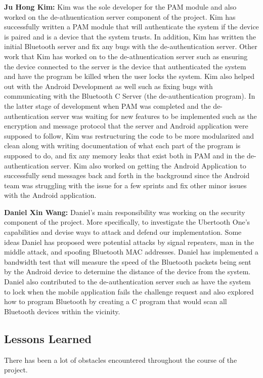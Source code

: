 \documentclass[letterpaper,twocolumn,10pt]{article}
\begin{document}
{{\textbf{Ju Hong Kim:} Kim was the sole developer for the PAM module and also worked on the de-athuentication server component of the project. Kim has successfully written a PAM module that will authenticate the system if the device is paired and is a device that the system trusts. In addition, Kim has written the initial Bluetooth server and fix any bugs with the de-authentication server. Other work that Kim has worked on to the de-athuentication server such as ensuring the device connected to the server is the device that authenticated the system and have the program be killed when the user locks the system. Kim also helped out with the Android Development as well such as fixing bugs with communicating with the Bluetooth C Server (the de-authentication program). In the latter stage of development when PAM  was completed and the de-authentication server was waiting for new features to be implemented such as the encryption and message protocol that the server and Android application were supposed to follow, Kim was restructuring the code to be more modularized and clean along with writing documentation of what each part of the program is supposed to do, and fix any memory leaks that exist both in PAM and in the de-authentication server. Kim also worked on getting the Android Application to successfully send messages back and forth in the background since the Android team was struggling with the issue for a few sprints and fix other minor issues with the Android application.

\textbf{Daniel Xin Wang:} Daniel's main responsibility was working on the security component of the project. More specifically, to investigate the Ubertooth One's capabilities and devise ways to attack and defend our implementation. Some ideas Daniel has proposed were potential attacks by signal repeaters, man in the middle attack, and spoofing Bluetooth MAC addresses. Daniel has implemented a bandwidth test that will measure the speed of the Bluetooth packets being sent by the Android device to determine the distance of the device from the system. Daniel also contributed to the de-authentication server such as have the system to lock when the mobile application fails the challenge request and also explored how to program Bluetooth by creating a C program that would scan all Bluetooth devices within the vicinity.

\subsection{Lessons Learned}
There has been a lot of obstacles encountered throughout the course of the project.

}}
\end{document}
